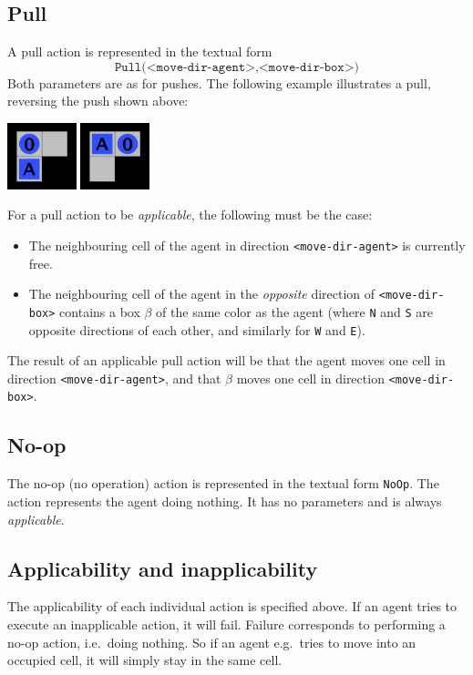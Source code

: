 \documentclass[12pt,a4paper]{article}
\begin{document}
\subsection{Pull} A pull action is represented in the textual form
    \[
        \texttt{Pull(<move-dir-agent>,<move-dir-box>)}
    \]
    Both parameters are as for pushes. The following example illustrates a pull, reversing the push shown above:
    \begin{center}
       \includegraphics[width=2cm]{action_example2} \quad
         \quad  
         \includegraphics[width=2cm]{action_example1}
    \end{center}
    For a pull action to be \emph{applicable}, the following must be the case:
    \begin{itemize}
        \item The neighbouring cell of the agent in direction \texttt{<move-dir-agent>} is currently free.
        \item The neighbouring cell of the agent in the \emph{opposite} direction of \texttt{<move-dir-box>} contains a box $\beta$ of the same color as the agent (where \texttt{N} and \texttt{S} are opposite directions of each other, and similarly for \texttt{W} and \texttt{E}).
    \end{itemize}
    The result of an applicable pull action will be that the agent moves one cell in direction \texttt{<move-dir-agent>}, and that $\beta$ moves one cell in direction \texttt{<move-dir-box>}.     
   
\subsection{No-op} The no-op (no operation) action is represented in the textual form \texttt{NoOp}. The action represents the agent doing nothing. It has no parameters and is always \emph{applicable}.

\subsection{Applicability and inapplicability}
The applicability of each individual action is specified above. If an agent tries to execute an inapplicable action, it will fail. Failure corresponds to performing a no-op action, i.e.\ doing nothing. So if an agent e.g.\ tries to move into an occupied cell, it will simply stay in the same cell. 
\end{document}
